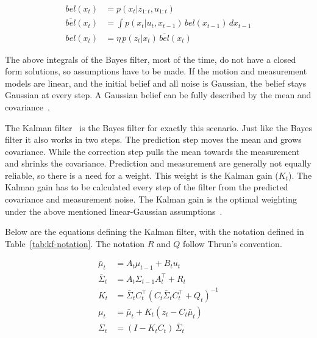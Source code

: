 \begin{align}
  bel(x_t) &= p(x_t | z_{1:t}, u_{1:t}) \\
  \overline{bel}(x_t) &= \int p(x_t | u_t, x_{t-1}) \, bel(x_{t-1}) \, dx_{t-1} \\
  bel(x_t) &= \eta \, p(z_t | x_t) \, \overline{bel}(x_t)
\end{align}

The above integrals of the Bayes filter, most of the time,
do not have a closed form solutions, so assumptions have to be made.
If the motion and measurement models are linear, and the initial belief and all noise is Gaussian,
the belief stays Gaussian at every step.
A Gaussian belief can be fully described by the mean and covariance~\citep[ch.~3]{thrun2005probabilistic}.

The Kalman filter~\citep{kalman1960new} is the Bayes filter for exactly this scenario.
Just like the Bayes filter it also works in two steps.
The prediction step moves the mean and grows covariance.
While the correction step pulls the mean towards the measurement and
shrinks the covariance.
Prediction and measurement are generally not equally reliable, so there is a need for
a weight. This weight is the Kalman gain ($K_t$). The Kalman gain has to be calculated
every step of the filter from the predicted covariance and measurement noise.
The Kalman gain is the optimal weighting under the above mentioned
linear-Gaussian assumptions~\citep[ch.~3]{thrun2005probabilistic}.

Below are the equations defining the Kalman filter, with the notation defined in Table~\ref{tab:kf-notation}.
The notation $R$ and $Q$ follow Thrun's convention.

\begin{align}
  \bar{\mu}_t &= A_t \mu_{t-1} + B_t u_t \\
  \bar{\Sigma}_t &= A_t \Sigma_{t-1} A_t^\top + R_t \\
  K_t &= \bar{\Sigma}_t C_t^\top \left( C_t \bar{\Sigma}_t C_t^\top + Q_t \right)^{-1} \\
  \mu_t &= \bar{\mu}_t + K_t \left( z_t - C_t \bar{\mu}_t \right) \\
  \Sigma_t &= (I - K_t C_t)\, \bar{\Sigma}_t
\end{align}

